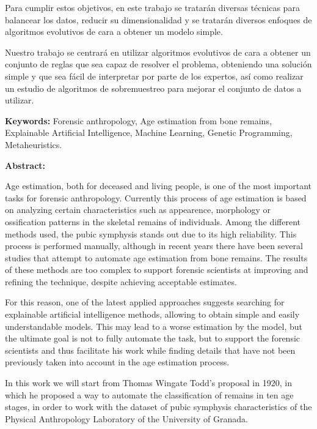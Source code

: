 Para cumplir estos objetivos, en este trabajo se tratarán diversas técnicas para balancear los datos, reducir su dimensionalidad y se tratarán diversos enfoques de algoritmos evolutivos de cara a obtener un modelo simple.

Nuestro trabajo se centrará en utilizar algoritmos evolutivos de cara a obtener un conjunto de reglas que sea capaz de resolver el problema, obteniendo una solución simple y que sea fácil de interpretar por parte de los expertos, así como realizar un estudio de algoritmos de sobremuestreo para mejorar el conjunto de datos a utilizar.

\newpage


\begin{center}
	{\large\textbf{\thetitleEN}}


	\theauthor
\end{center}

\textbf{Keywords:} Forensic anthropology, Age estimation from bone remains, Explainable Artificial Intelligence,
Machine Learning, Genetic Programming, Metaheuristics.

\textbf{Abstract:}

Age estimation, both for deceased and living people, is one of the most important tasks for forensic anthropology. Currently this process of age estimation is based on analyzing certain characteristics such as appearence, morphology or ossification patterns in the skeletal remains of individuals. Among the different methods used, the pubic symphysis stands out due to its high reliability. This process is performed manually, although in recent years there have been several studies that attempt to automate age estimation from bone remains. The results of these methods are too complex to support forensic scientists at improving and refining the technique, despite achieving acceptable estimates.

For this reason, one of the latest applied approaches suggests searching for explainable artificial intelligence methods, allowing to obtain simple and easily understandable models. This may lead to a worse estimation by the model, but the ultimate goal is not to fully automate the task, but to support the forensic scientists and thus facilitate his work while finding details that have not been previously taken into account in the age estimation process.

In this work we will start from Thomas Wingate Todd's proposal in 1920, in which he proposed a way to automate the classification of remains in ten age stages, in order to work with the dataset of pubic symphysis characteristics of the Physical Anthropology Laboratory of the University of Granada.

